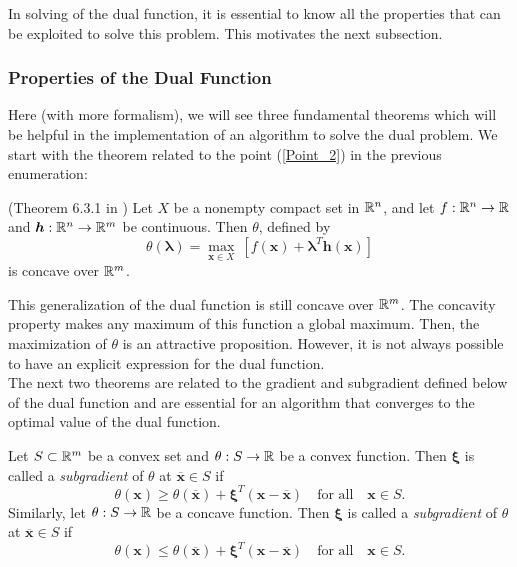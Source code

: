 In solving of the dual function, it 
is essential to know all the properties that can be exploited to solve this 
problem. This motivates the next subsection.

\subsubsection{Properties of the Dual Function} \label{Properties_DF}

Here (with more formalism), we will see three fundamental theorems which will be helpful in the implementation of an algorithm to solve the dual problem. 
We start with the theorem related to the point (\ref{Point_2}) in the previous 
enumeration:
\begin{theorem}{(Theorem 6.3.1 in \cite{bazaraa2013nonlinear})}
Let $X$ be a nonempty compact set in $\mathbb{R}^n$, and let $f:\mathbb{R}^n\to\mathbb{R}$ and $\bm{h}:\mathbb{R}^n\to\mathbb{R}^m$ 
be continuous. Then $\theta$, defined by
\begin{equation}
\theta(\bm{\lambda})=\max_{\bm{x}\in X}\ \left[f(\bm{x})+\bm{\lambda}^T\bm{h}(\bm{x})\right]
\label{GenDual}
\end{equation}
is concave over $\mathbb{R}^m$.
\end{theorem}
This generalization of the dual function is still concave over $\mathbb{R}^m$. The 
concavity property makes any maximum of this function a global maximum. 
Then, the maximization of $\theta$ is an attractive proposition. However, it is not always possible to have an explicit expression for the dual 
function.\\
The next two theorems are related to the gradient and subgradient 
defined below of the dual function and are essential for
an algorithm that converges to the optimal value of the dual function. 

\begin{definition} \label{Def_Subgradient}
Let $S\subset\mathbb{R}^m$ be a convex set and $\theta:S\to\mathbb{R}$ be a convex function. 
Then $\bm{\xi}$ is called a \textit{subgradient} of $\theta$ at $\overline{\bm{x}}\in S$ if
\begin{equation}
\theta(\bm{x})\geq\theta(\overline{\bm{x}})+\bm{\xi}^T(\bm{x}-\overline{\bm{x}})\quad\text{for all}\quad\bm{x}\in S.
\end{equation}
Similarly, let $\theta:S\to\mathbb{R}$ be a concave function. Then $\bm{\xi}$ is called
 a \textit{subgradient} of $\theta$ at $\overline{\bm{x}}\in S$ if
\begin{equation}
\theta(\bm{x})\leq\theta(\overline{\bm{x}})+\bm{\xi}^T(\bm{x}-\overline{\bm{x}})\quad\text{for all}\quad\bm{x}\in S.
\end{equation}
\end{definition}

